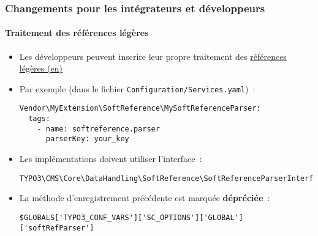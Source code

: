 %

\begin{frame}[fragile]
	\frametitle{Changements pour les intégrateurs et développeurs}
	\framesubtitle{Traitement des références légères}


	\begin{itemize}
		\item Les développeurs peuvent inscrire leur propre traitement des
			\href{https://docs.typo3.org/m/typo3/reference-coreapi/master/en-us/ApiOverview/SoftReferences/Index.html#soft-references}{références légères (en)}

		\item Par exemple (dans le fichier \texttt{Configuration/Services.yaml})~:
\begin{lstlisting}
Vendor\MyExtension\SoftReference\MySoftReferenceParser:
  tags:
    - name: softreference.parser
      parserKey: your_key
\end{lstlisting}

		\item Les implémentations doivent utiliser l'interface~:
\begin{lstlisting}
TYPO3\CMS\Core\DataHandling\SoftReference\SoftReferenceParserInterface
\end{lstlisting}

		\item La méthode d'enregistrement précédente est marquée \textbf{dépréciée}~:
\begin{lstlisting}
$GLOBALS['TYPO3_CONF_VARS']['SC_OPTIONS']['GLOBAL']['softRefParser']
\end{lstlisting}

	\end{itemize}

\end{frame}

